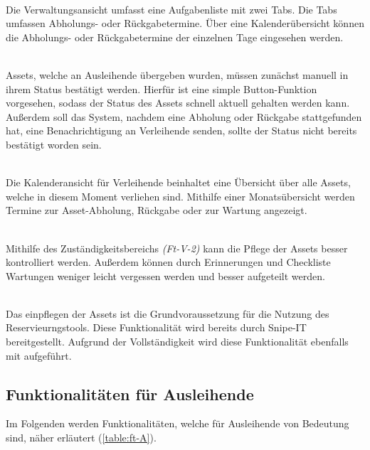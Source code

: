 {\sffamily\color{maincolor}{Ft-V-1 | Verwaltungsansicht }}\\
Die Verwaltungsansicht umfasst eine Aufgabenliste mit zwei Tabs. Die Tabs umfassen Abholungs- oder
Rückgabetermine. Über eine Kalenderübersicht können die Abholungs- oder Rückgabetermine der
einzelnen Tage eingesehen werden.

    {\sffamily\color{maincolor}{Ft-V-2 | Bearbeiten des Assetstatus }}\\
Assets, welche an Ausleihende übergeben wurden, müssen zunächst manuell in ihrem
Status bestätigt werden. Hierfür ist eine simple Button-Funktion vorgesehen,
sodass der Status des Assets schnell aktuell gehalten werden kann. Außerdem soll
das System, nachdem eine Abholung oder Rückgabe stattgefunden hat, eine
Benachrichtigung an Verleihende senden, sollte der Status nicht bereits
bestätigt worden sein.

    {\sffamily\color{maincolor}{Ft-V-3 | Kalenderansicht für Verleihende}}\\
Die Kalenderansicht für Verleihende beinhaltet eine Übersicht über alle Assets,
welche in diesem Moment verliehen sind. Mithilfe einer Monatsübersicht werden
Termine zur Asset-Abholung, Rückgabe oder zur Wartung angezeigt.


    {\sffamily\color{maincolor}{Ft-V-4 | Pflege von Assets   }}\\
Mithilfe des Zuständigkeitsbereichs \textit{(Ft-V-2)} kann die Pflege der Assets
besser kontrolliert werden. Außerdem können durch Erinnerungen und Checkliste
Wartungen weniger leicht vergessen werden und besser aufgeteilt werden.

    {\sffamily\color{maincolor}{Ft-V-5 | Pflege der Datenbank }}\\
Das einpflegen der Assets ist die Grundvoraussetzung für die Nutzung des Reservieurngstools. Diese
Funktionalität wird bereits durch Snipe-IT bereitgestellt. Aufgrund der Vollständigkeit wird diese
Funktionalität ebenfalls mit aufgeführt.

\subsection{Funktionalitäten für Ausleihende}
Im Folgenden werden Funktionalitäten, welche für Ausleihende von Bedeutung sind,
näher erläutert (\ref{table:ft-A}).

